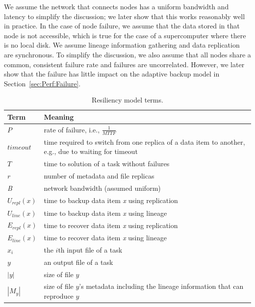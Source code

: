 \documentclass{sig-alternate}
\newcommand{\katznote}[1]{ {\textcolor{blue}    { ***Dan:      #1 }}}
\newcommand{\zhaonote}[1]{{\textcolor{cyan}    { ***Zhao:      #1 }}}
\newcommand{\kylenote}[1]{{\textcolor{orange}    { ***Kyle:      #1 }}}
\newcommand{\katznote}[1]{}
\newcommand{\zhaonote}[1]{}
\newcommand{\kylenote}[1]{}
\begin{document}
We assume the network that connects nodes has a uniform bandwidth and latency to simplify the discussion; we later show that this works reasonably well in practice. 
In the case of node failure, we assume that the data stored in that node is not accessible, which is true for the case of a supercomputer where there is no local disk.
We assume lineage information gathering and data replication are synchronous. To simplify the discussion, we also assume that all nodes share a common, consistent failure rate and failures are uncorrelated. However, we later show that the failure has little impact on the adaptive backup model in Section~\ref{sec:Perf:Failure}. 


\begin{table}
\centering
\caption{Resiliency model terms.}
\label{tab:modelterms}
\begin{tabular}{|p{1cm}|p{6.25cm}|} \hline
Term & Meaning \\ \hline
{$P$} 					& rate of failure, i.e., $\frac{1}{MTTF}$ \\
{$timeout$} 					& time required to switch from one replica of a data item to another, e.g., due to waiting for timeout \\
{$T$}					& time to solution of a task without failures\\
{$r$} 					& number of metadata and file replicas \\
{\em B} 				& network bandwidth (assumed uniform) \\
{$U_{repl}(x)$} &  time to backup data item {\em x} using replication \\
{$U_{line}(x)$} &  time to backup data item {\em x} using lineage \\
{$E_{repl}(x)$} &   time to recover data item {\em x} using replication \\
{$E_{line}(x)$} &   time to recover data item {\em x} using lineage \\
{$x_i$} 				& the $i$th input file of a task \\
{$y$}				& an output file of a task \\
{$|y|$}				& size of file $y$ \\
{$|M_{y}|$}		& size of file $y$'s metadata including the lineage information that can reproduce $y$\\
\hline\end{tabular}
\end{table}
\end{document}
